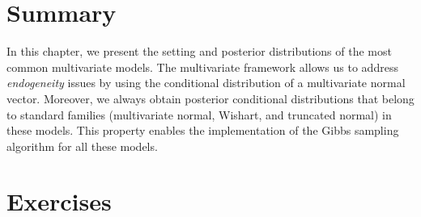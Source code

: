 \section{Summary}\label{sec75}
In this chapter, we present the setting and posterior distributions of the most common multivariate models. The multivariate framework allows us to address \textit{endogeneity} issues by using the conditional distribution of a multivariate normal vector. Moreover, we always obtain posterior conditional distributions that belong to standard families (multivariate normal, Wishart, and truncated normal) in these models. This property enables the implementation of the Gibbs sampling algorithm for all these models.

\section{Exercises}\label{sec76}
